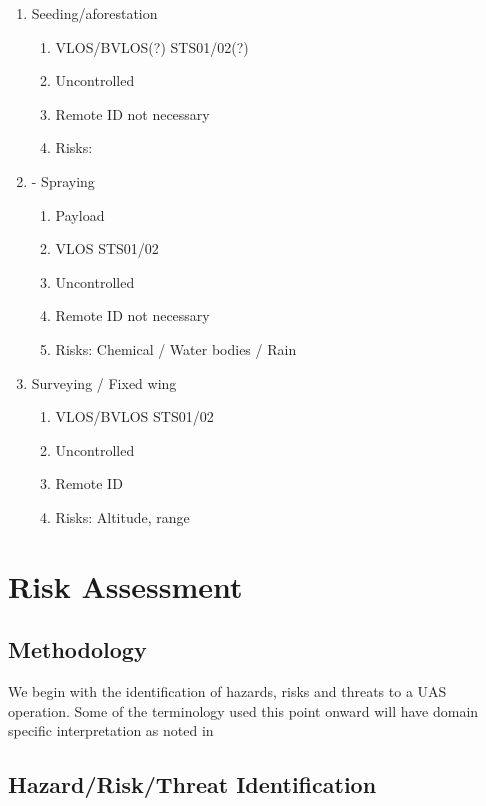 \documentclass{ua_wgs_base}
\begin{document}
\begin{enumerate}

   \item Seeding/aforestation

\begin{enumerate}
   \item VLOS/BVLOS(?) STS01/02(?)
   \item Uncontrolled
   \item Remote ID not necessary
   \item Risks: 
\end{enumerate}
   \item - Spraying
\begin{enumerate}
         \item Payload 
         \item VLOS STS01/02
         \item Uncontrolled
         \item Remote ID not necessary
         \item Risks: Chemical / Water bodies / Rain
\end{enumerate}
         \item Surveying / Fixed wing
\begin{enumerate}
  \item VLOS/BVLOS STS01/02
  \item Uncontrolled
  \item Remote ID
  \item Risks: Altitude, range
\end{enumerate}

\end{enumerate}

\cleardoublepage{}

\chapter{Risk Assessment}

\section{Methodology}

We begin with the identification of hazards, risks and threats to
a UAS operation. Some of the terminology used this point onward will
have domain specific interpretation as noted in 

\section{Hazard/Risk/Threat Identification}
\end{document}
